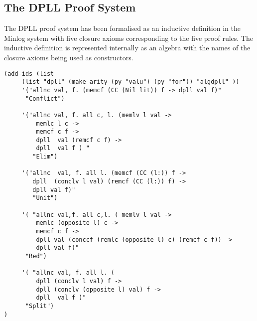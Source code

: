 \subsection*{The DPLL Proof System}
The DPLL proof system has been formalised as an inductive definition in the Minlog system with five closure axioms corresponding to the five proof rules. The inductive definition is represented internally as an algebra with the names of the closure axioms being used as constructors.

\begin{lstlisting}[caption = "The DPLL Proof System as an Inductive Definition in Minlog"]
(add-ids (list 
     (list "dpll" (make-arity (py "valu") (py "for")) "algdpll" ))
     '("allnc val, f. (memcf (CC (Nil lit)) f -> dpll val f)"
      "Conflict")

     '("allnc val, f. all c, l. (memlv l val ->                                                                                                             
         memlc l c ->                                                                                                                     
         memcf c f ->                                                                                                                     
         dpll  val (remcf c f) ->                                                                                                         
         dpll  val f ) "
        "Elim")

     '("allnc  val, f. all l. (memcf (CC (l:)) f ->                                                                                                         
        dpll  (conclv l val) (remcf (CC (l:)) f) ->                                                                                        
        dpll val f)"
        "Unit")

     '( "allnc val,f. all c,l. ( memlv l val ->                                                                                                             
         memlc (opposite l) c ->                                                                                                         
         memcf c f ->                                                                                                                    
         dpll val (conccf (remlc (opposite l) c) (remcf c f)) ->                                                                         
         dpll val f)"
      "Red")

     '( "allnc val, f. all l. (                                                                                                                             
         dpll (conclv l val) f ->                                                                                                         
         dpll (conclv (opposite l) val) f ->                                                                                              
         dpll  val f )"
      "Split")
)
\end{lstlisting}

